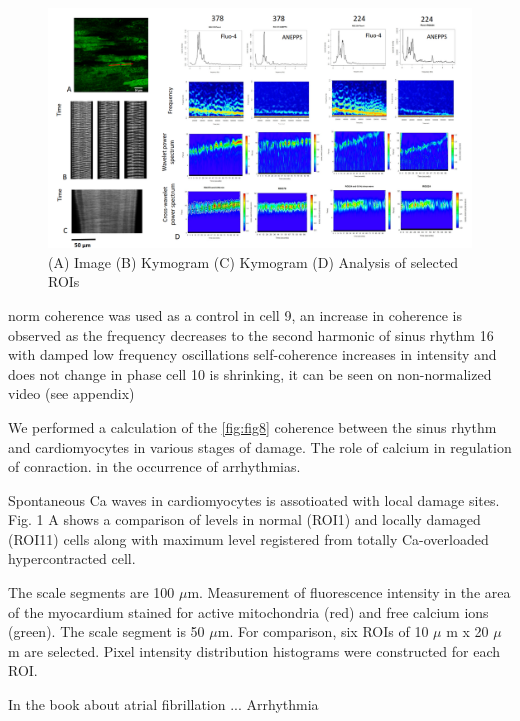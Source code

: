 \documentclass{biophys-new}
\begin{document}
\begin{figure}[hbt!]
\centering
\includegraphics[width=0.9\linewidth]{fig10.png}
\caption{ (A) Image (B) Kymogram (C) Kymogram (D) Analysis of selected ROIs }
\label{fig:fig10}
\end{figure}


norm coherence was used as a control
in cell 9, an increase in coherence is observed as the frequency decreases to the second harmonic of sinus rhythm
16 with damped low frequency oscillations
self-coherence increases in intensity and does not change in phase
cell 10 is shrinking, it can be seen on non-normalized video (see appendix)




We performed a calculation of the \ref{fig:fig8} coherence between the sinus rhythm and cardiomyocytes in various stages of damage.
The role of calcium in regulation of conraction.
in the occurrence of arrhythmias.


Spontaneous Ca waves in cardiomyocytes is assotioated with local damage sites.
Fig. 1 A shows a comparison of  levels in normal (ROI1) and locally damaged (ROI11) cells along with maximum  level registered from totally Ca-overloaded hypercontracted cell.


The scale segments are 100 $\mu$m.
Measurement of fluorescence intensity in the area of the myocardium stained for active mitochondria (red) and free calcium ions (green).
The scale segment is 50 $\mu$m.
For comparison, six ROIs of 10 $\mu$ m x 20 $\mu$ m are selected.
Pixel intensity distribution histograms were constructed for each ROI.


In the book \cite{kockskamper2002subcellular} about atrial fibrillation ...
Arrhythmia


\end{document}
